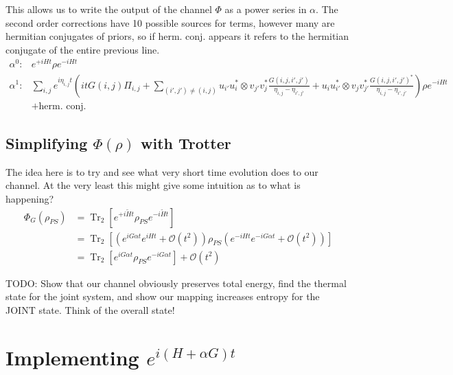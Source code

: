 \documentclass{article}
\newcommand{\parens}[1]{\left( #1 \right)}
\newcommand{\brackets}[1]{\left[ #1 \right]}
\newcommand{\bigo}[1]{\mathcal{O}\left( #1 \right)}
\DeclareMathOperator{\Tr}{Tr}
\newcommand{\partrace}[2]{\Tr_{#1} \brackets{ #2 }}
\begin{document}
This allows us to write the output of the channel $\Phi$ as a power series in $\alpha$. The second order corrections have 10 possible sources for terms, however many are hermitian conjugates of priors, so if herm. conj. appears it refers to the hermitian conjugate of the entire previous line.
\begin{align}
\alpha^0 :& e^{+i H t} \rho e^{-i H t} \\
 \alpha^1 :& \sum_{i,j} e^{i\eta_{i,j}t} \parens{i t G(i,j) \Pi_{i,j} + \sum_{(i',j') \neq (i,j)} u_{i'} u_i^* \otimes v_{j'} v_j^* \frac{G(i,j,i',j')}{\eta_{i,j} - \eta_{i',j'}} + u_i u_{i'}^* \otimes v_j v_{j'}^* \frac{G(i,j,i',j')^*}{\eta_{i,j} - \eta_{i',j'}}} \rho e^{- i H t} \\
 &+ \text{herm. conj.}
\end{align}


\subsection{Simplifying $\Phi(\rho)$ with Trotter}
The idea here is to try and see what very short time evolution does to our channel. At the very least this might give some intuition as to what is happening?
\begin{align}
    \Phi_G(\rho_{PS}) &= \partrace{2}{e^{+i\widetilde{H}t} \rho_{PS} e^{-i \widetilde{H} t}} \\
    &= \partrace{2}{\parens{e^{i G \alpha t} e^{i H t} + \bigo{t^2}} \rho_{PS} \parens{e^{-iHt} e^{-i G \alpha t} + \bigo{t^2}}} \\
    &= \partrace{2}{e^{i G \alpha t} \rho_{PS} e^{-i G \alpha t}} + \bigo{t^2} 
\end{align}

TODO: Show that our channel obviously preserves total energy, find the thermal state for the joint system, and show our mapping increases entropy for the JOINT state. Think of the overall state!

\section{Implementing $e^{i (H + \alpha G) t}$}



\end{document}
